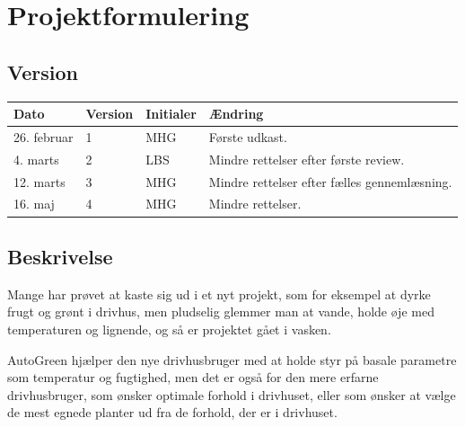 \chapter{Projektformulering} \label{ch:Projektformulering}

\section*{Version}
\begin{table}[h]
	\centering
	\begin{tabularx}{\textwidth - 2cm}{|l|l| l|X|}
	\hline
	Dato	& Version	& Initialer & Ændring	\\ \hline
	26. februar & 1 & MHG & Første udkast. \\ \hline
	4. marts & 2 & LBS & Mindre rettelser efter første review. \\ \hline
	12. marts & 3 & MHG & Mindre rettelser efter fælles gennemlæsning. \\\hline
	16. maj & 4 & MHG & Mindre rettelser. \\\hline
	\end{tabularx}
\end{table}

\clearpage

\section{Beskrivelse}
Mange har prøvet at kaste sig ud i et nyt projekt, som for eksempel at dyrke frugt og grønt i drivhus, men pludselig glemmer man at vande, holde øje med temperaturen og lignende, og så er projektet gået i vasken.
 
AutoGreen hjælper den nye drivhusbruger med at holde styr på basale parametre som temperatur og fugtighed, men det er også for den mere erfarne drivhusbruger, som ønsker optimale forhold i drivhuset, eller som ønsker at vælge de mest egnede planter ud fra de forhold, der er i drivhuset.
 
